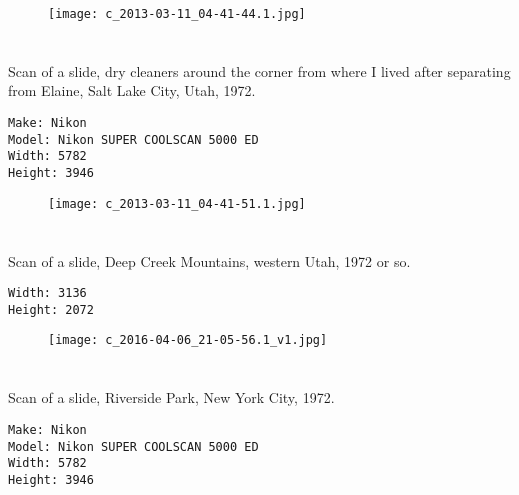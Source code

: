 \documentclass[11pt,letter,DIV=14,paper=landscape]{scrbook}
\begin{document}
\begin{figure}
\texttt{[image: c\_2013-03-11\_04-41-44.1.jpg]}
\end{figure}
    
\clearpage
\section{\protect{}}
\noindent Scan of a slide, dry cleaners around the corner from where I lived after separating from Elaine, Salt Lake City, Utah, 1972.
\noindent
\begin{lstlisting}
Make: Nikon
Model: Nikon SUPER COOLSCAN 5000 ED
Width: 5782
Height: 3946
\end{lstlisting}
\clearpage

\begin{figure}
\texttt{[image: c\_2013-03-11\_04-41-51.1.jpg]}
\end{figure}
    
\clearpage
\section{\protect{}}
\noindent Scan of a slide, Deep Creek Mountains, western Utah, 1972 or so.
\noindent
\begin{lstlisting}
Width: 3136
Height: 2072
\end{lstlisting}
\clearpage

\begin{figure}
\texttt{[image: c\_2016-04-06\_21-05-56.1\_v1.jpg]}
\end{figure}

\clearpage
\section{\protect{}}
\noindent Scan of a slide, Riverside Park, New York City, 1972.
\noindent
\begin{lstlisting}
Make: Nikon
Model: Nikon SUPER COOLSCAN 5000 ED
Width: 5782
Height: 3946
\end{lstlisting}
\clearpage
\end{document}
